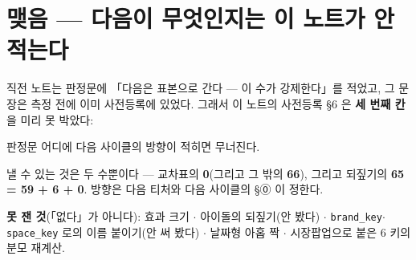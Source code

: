 \documentclass{article}
\begin{document}
\section{맺음 --- 다음이 무엇인지는 이 노트가 안 적는다}

직전 노트는 판정문에 「다음은 표본으로 간다 --- 이 수가 강제한다」를 적었고,
그 문장은 측정 전에 이미 사전등록에 있었다. 그래서 이 노트의 사전등록 \S 6 은
\textbf{세 번째 칸}을 미리 못 박았다:

{판정문 어디에 다음 사이클의 방향이 적히면 무너진다.}

낼 수 있는 것은 두 수뿐이다 --- 교차표의 \textbf{0}(그리고 그 밖의 \textbf{66}),
그리고 되짚기의 \textbf{65 = 59 + 6 + 0}.
방향은 다음 티처와 다음 사이클의 \S ⓪ 이 정한다.

\textbf{못 잰 것}(「없다」가 아니다): 효과 크기 $\cdot$ 아이돌의 되짚기(안 봤다) $\cdot$
\texttt{brand\_key}$\cdot$\texttt{space\_key} 로의 이름 붙이기(안 써 봤다) $\cdot$
날짜형 아홉 짝 $\cdot$ 시장팝업으로 붙은 6 키의 분모 재계산.
\end{document}
